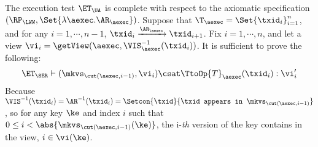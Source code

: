 The execution test $\ET_\UA$ is complete with respect to the axiomatic specification \( (\RP_{\LWW}, \Set{\lambda \aexec. \AR_\aexec }) \).
Suppose that $\T_{\aexec} = \Set{\txid_{i}}_{i=1}^{n}$, and for any $i=1,\cdots, n-1$,
$\txid_{i} \xrightarrow{\AR_{\aexec}} \txid_{i+1}$.
Fix $i=1,\cdots,n$, and let a view $\vi_{i} = \getView(\aexec, \VIS^{-1}_{\aexec}(\txid_{i}))$.
It is sufficient to prove the following:
\[
    \ET_\SER \vdash ( \mkvs_{\cut(\aexec, i-1)}, \vi_i ) \csat \TtoOp{T}_{\aexec}(\txid_{i}) : \vi'_{i}
\]
Because \( \VIS^{-1}(\txid_i) = \AR^{-1}(\txid_i) = \Setcon{\txid }{\txid \texttt{ appears in } \mkvs_{\cut(\aexec, i-1)} }\),
so for any key \( \ke \) and index \( i \) such that \( 0 \leq i < \abs{\mkvs_{\cut(\aexec, i-1)}(\ke)} \),
the i-\emph{th} version of the key contains in the view, \ie \( i \in \vi(\ke)\).
